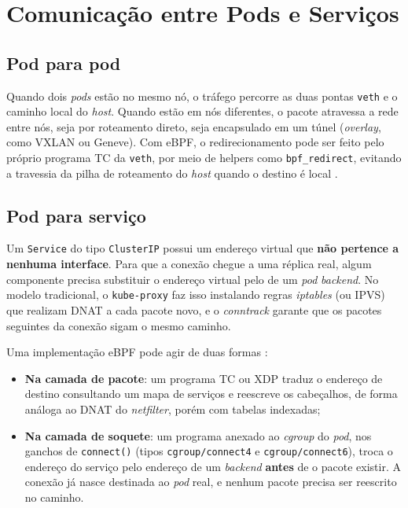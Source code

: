 \section{Comunicação entre Pods e Serviços}

\subsection*{Pod para pod}

Quando dois \textit{pods} estão no mesmo nó, o tráfego percorre as duas pontas
\texttt{veth} e o caminho local do \textit{host}. Quando estão em nós diferentes, o
pacote atravessa a rede entre nós, seja por roteamento direto, seja encapsulado em um
túnel (\textit{overlay}, como VXLAN ou Geneve). Com eBPF, o redirecionamento pode ser
feito pelo próprio programa TC da \texttt{veth}, por meio de helpers como
\texttt{bpf\_redirect}, evitando a travessia da pilha de roteamento do \textit{host}
quando o destino é local \cite{linuxkernel2024, ciliumdocs}.

\subsection*{Pod para serviço}

Um \texttt{Service} do tipo \texttt{ClusterIP} possui um endereço virtual que
\textbf{não pertence a nenhuma interface}. Para que a conexão chegue a uma réplica
real, algum componente precisa substituir o endereço virtual pelo de um \textit{pod}
\textit{backend}. No modelo tradicional, o \texttt{kube-proxy} faz isso instalando
regras \textit{iptables} (ou IPVS) que realizam DNAT a cada pacote novo, e o
\textit{conntrack} garante que os pacotes seguintes da conexão sigam o mesmo caminho.

Uma implementação eBPF pode agir de duas formas \cite{ciliumdocs}:

\begin{itemize}
  \item \textbf{Na camada de pacote}: um programa TC ou XDP traduz o endereço de
        destino consultando um mapa de serviços e reescreve os cabeçalhos, de
        forma análoga ao DNAT do \textit{netfilter}, porém com tabelas indexadas;
  \item \textbf{Na camada de soquete}: um programa anexado ao \textit{cgroup} do
        \textit{pod}, nos ganchos de \texttt{connect()} (tipos
        \texttt{cgroup/connect4} e \texttt{cgroup/connect6}), troca o endereço do
        serviço pelo endereço de um \textit{backend} \textbf{antes} de o pacote existir.
        A conexão já nasce destinada ao \textit{pod} real, e nenhum pacote
        precisa ser reescrito no caminho.
\end{itemize}

